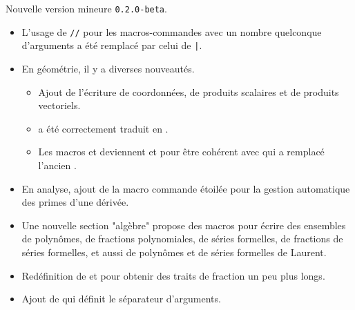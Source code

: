 Nouvelle version mineure \verb+0.2.0-beta+.

\begin{itemize}[itemsep=.5em]
    \item L'usage de \verb+//+ pour les macros-commandes avec un nombre quelconque d'arguments a été remplacé par celui de \verb+|+.




    \item En géométrie, il y a diverses nouveautés.
    \begin{itemize}[itemsep=.5em]
        \item Ajout de l'écriture de coordonnées, de produits scalaires et de produits vectoriels.

        \item {} a été correctement traduit en .

        \item Les macros  et  deviennent  et  pour être cohérent avec  qui a remplacé l'ancien .
    \end{itemize}




    \item En analyse, ajout de la macro commande étoilée  pour la gestion automatique des primes d'une dérivée.




    \item Une nouvelle section "algèbre" propose des macros pour écrire des ensembles de polynômes, de fractions polynomiales, de séries formelles, de fractions de séries formelles, et aussi de polynômes et de séries formelles de Laurent.




    \item Redéfinition de  et  pour obtenir des traits de fraction un peu plus longs.




    \item Ajout de  qui définit le séparateur d'arguments.
\end{itemize}
